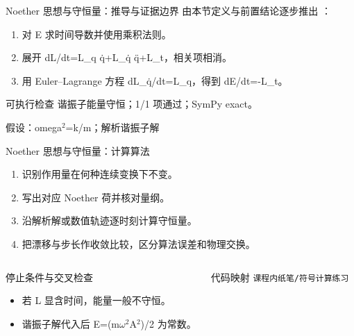 \begin{frame}[t]{Noether 思想与守恒量：推导与证据边界}
\footnotesize
{}\quad 由本节定义与前置结论逐步推出 ：
\begin{enumerate}
\item 对 E 求时间导数并使用乘积法则。
\item 展开 dL/\allowbreak{}dt=L\_q q̇+L\_q̇ q̈+L\_t，相关项相消。
\item 用 Euler--Lagrange 方程 dL\_q̇/\allowbreak{}dt=L\_q，得到 dE/\allowbreak{}dt=-L\_t。
\end{enumerate}\begin{block}{可执行检查}
\quad 谐振子能量守恒；1/1 项通过；SymPy exact。
\par\scriptsize 假设：omega\ensuremath{^{2}}=k/\allowbreak{}m；解析谐振子解
\end{block}
\end{frame}

\begin{frame}[t]{Noether 思想与守恒量：计算算法}
\footnotesize
{}\begin{enumerate}
\item 识别作用量在何种连续变换下不变。
\item 写出对应 Noether 荷并核对量纲。
\item 沿解析解或数值轨迹逐时刻计算守恒量。
\item 把漂移与步长作收敛比较，区分算法误差和物理交换。
\end{enumerate}\begin{columns}[T,onlytextwidth]
\begin{block}{停止条件与交叉检查}\scriptsize\begin{itemize}
\item[\CheckMark] 若 L 显含时间，能量一般不守恒。
\item[\CheckMark] 谐振子解代入后 E=(m\ensuremath{\omega}\ensuremath{^{2}}A\ensuremath{^{2}})/\allowbreak{}2 为常数。
\end{itemize}\end{block}
\begin{block}{代码映射}
\scriptsize \texttt{课程内纸笔/\allowbreak{}符号计算练习}
\end{block}\end{columns}\end{frame}

